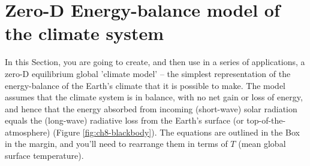 \documentclass{tufte-book} %
\begin{document}

\newpage


\section{Zero-D Energy-balance model of the climate system}

In this Section, you are going to create, and then use in a series of applications, a zero-D equilibrium global 'climate model' --  the  simplest representation of the energy-balance   of the Earth's climate that it is possible to make. The model assumes that the climate system is in balance, with no net gain or loss of energy, and hence that the energy absorbed from incoming (short-wave) solar radiation equals the (long-wave) radiative loss from the Earth's surface (or top-of-the-atmosphere) (Figure \ref{fig:ch8-blackbody}). The equations are outlined in the Box in the margin, and you'll need to rearrange them in terms of \(T\) (mean global surface temperature).
\end{document}
